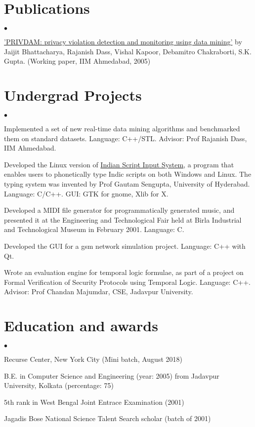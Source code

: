 \documentclass[margin,line]{res}
\newenvironment{list1}{
  \begin{list}{$\bullet$}{%
      \setlength{\itemsep}{0in}
      \setlength{\parsep}{0in} \setlength{\parskip}{0in}
      \setlength{\topsep}{0in} \setlength{\partopsep}{0in}
      \setlength{\leftmargin}{0.17in}}}{\end{list}}
\begin{document}
\begin{resume}
\section{\sc Publications}
\begin{list1}
	\item \href{https://www.researchgate.net/publication/229005723_PRIVDAM_Privacy_Violation_Detection_and_Monitoring_Using_Data_Mining}{'PRIVDAM: privacy violation detection and monitoring using data mining'}
by Jaijit Bhattacharya, Rajanish Dass, Vishal Kapoor, Debamitro Chakraborti, S.K. Gupta.
(Working paper, IIM Ahmedabad, 2005)
\end{list1}

\section{\sc Undergrad Projects}
\begin{list1}
	\item Implemented a set of new real-time data mining algorithms and benchmarked them on standard datasets. Language: C++/STL. Advisor: Prof Rajanish Dass, IIM Ahmedabad.
	\item Developed the Linux version of  \href{http://www.bangla.name/isis}{Indian Script Input System}, a program that enables users to phonetically type Indic scripts on both Windows and Linux. The typing system was invented by Prof Gautam Sengupta, University of Hyderabad. Language: C/C++. GUI: GTK for gnome, Xlib for X.
	\item Developed a MIDI file generator for programmatically generated music, and presented it at the Engineering and Technological Fair held at Birla Industrial and Technological Museum in February 2001. Language: C.
	\item Developed the GUI for a gsm network simulation project. Language: C++ with Qt.
	\item Wrote an evaluation engine for temporal logic formulae, as part of a project on Formal Verification of Security Protocols using Temporal Logic. Language: C++. Advisor: Prof Chandan Majumdar, CSE, Jadavpur University.
\end{list1}

\section{\sc Education and awards}
\begin{list1}
	\item Recurse Center, New York City (Mini batch, August 2018)
	\item B.E. in Computer Science and Engineering (year: 2005)
from Jadavpur University, Kolkata (percentage: 75)
	\item 5th rank in West Bengal Joint Entrace Examination (2001)
	\item Jagadis Bose National Science Talent Search scholar (batch of 2001)
\end{list1}

\end{resume}
\end{document}
